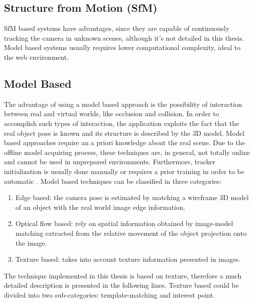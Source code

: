 \subsection{Structure from Motion (SfM)} %
\label{sub:basic_concepts:markerless_tracking_technique:sfm}

SfM based systems have advantages, since they are capable of continuously tracking the camera in unknown scenes, although it's not detailed in this thesis. Model based systems usually requires lower computational complexity, ideal to the web environment.


\subsection{Model Based} %
\label{sub:basic_concepts:markerless_tracking_technique:model_based}

The advantage of using a model based approach is the possibility of interaction between real and virtual worlds, like occlusion and collision. In order to accomplish such types of interaction, the application exploits the fact that the real object pose is known and its structure is described by the 3D model. Model based approaches require an a priori knowledge about the real scene. Due to the offline model acquiring process, these techniques are, in general, not totally online and cannot be used in unprepared environments. Furthermore, tracker initialization is usually done manually or requires a prior training in order to be automatic \cite{Teichrieb2007}. Model based techniques can be classified in three categories:

\begin{enumerate}
  \item Edge based: the camera pose is estimated by matching a wireframe 3D model of an object with the real world image edge information.
  \item Optical flow based: rely on spatial information obtained by image-model matching extracted from the relative movement of the object projection onto the image.
  \item Texture based: takes into account texture information presented in images.
\end{enumerate}

The technique implemented in this thesis is based on texture, therefore a much detailed description is presented in the following lines. Texture based could be divided into two sub-categories: template-matching and interest point.

